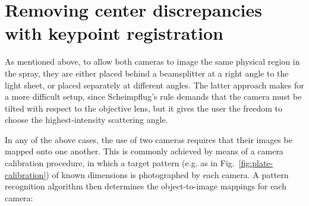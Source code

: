 \documentclass[11.5pt]{book}
\newcommand*{\figref}[1]{Fig.~\ref{#1}}
\begin{document}
\section{Removing center discrepancies with keypoint registration}
\label{sec:keypoint-registration}

As mentioned above, to allow both cameras to image the same physical region in
the spray, they are either placed behind a beamsplitter at a right angle to the
light sheet, or placed separately at different angles. The latter approach makes
for a more difficult setup, since Scheimpflug's rule demands that the camera
must be tilted with respect to the objective lens, but it gives the user the
freedom to choose the highest-intensity scattering angle.

In any of the above cases, the use of two cameras requires that their images be
mapped onto one another. This is commonly achieved by means of a camera
calibration procedure, in which a target pattern (e.g. as in \figref{fig:plate-calibration}) of known dimensions is
photographed by each camera. A pattern recognition algorithm then determines the
object-to-image mappings for each camera:
\end{document}
